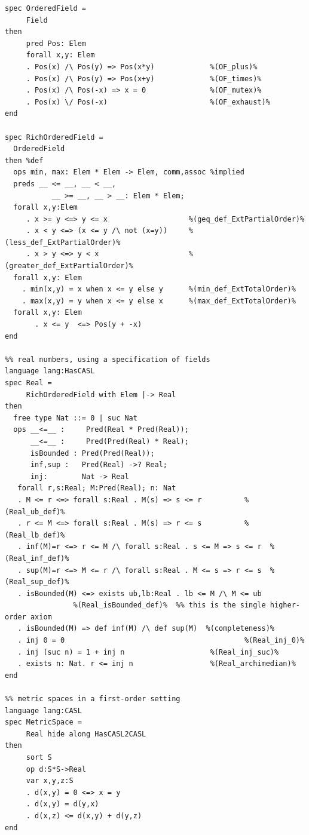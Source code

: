 \documentclass[10pt, a4paper]{isov2}
\begin{document}
\begin{lstlisting}[basicstyle=\ttfamily,language=dolText,alsolanguage=CASL,escapechar=@,mathescape]
spec OrderedField =
     Field
then
     pred Pos: Elem
     forall x,y: Elem
     . Pos(x) /\ Pos(y) => Pos(x*y)             %(OF_plus)%
     . Pos(x) /\ Pos(y) => Pos(x+y)             %(OF_times)%
     . Pos(x) /\ Pos(-x) => x = 0               %(OF_mutex)%
     . Pos(x) \/ Pos(-x)                        %(OF_exhaust)%
end

spec RichOrderedField =
  OrderedField 
then %def
  ops min, max: Elem * Elem -> Elem, comm,assoc %implied
  preds __ <= __, __ < __,
           __ >= __, __ > __: Elem * Elem;
  forall x,y:Elem
     . x >= y <=> y <= x                   %(geq_def_ExtPartialOrder)%
     . x < y <=> (x <= y /\ not (x=y))     %(less_def_ExtPartialOrder)%
     . x > y <=> y < x                     %(greater_def_ExtPartialOrder)%
  forall x,y: Elem
    . min(x,y) = x when x <= y else y      %(min_def_ExtTotalOrder)%
    . max(x,y) = y when x <= y else x      %(max_def_ExtTotalOrder)%
  forall x,y: Elem
       . x <= y  <=> Pos(y + -x)
end

%% real numbers, using a specification of fields
language lang:HasCASL
spec Real =
     RichOrderedField with Elem |-> Real
then
  free type Nat ::= 0 | suc Nat
  ops __<=__ :     Pred(Real * Pred(Real));
      __<=__ :     Pred(Pred(Real) * Real);
      isBounded : Pred(Pred(Real));
      inf,sup :   Pred(Real) ->? Real;
      inj:        Nat -> Real
   forall r,s:Real; M:Pred(Real); n: Nat
   . M <= r <=> forall s:Real . M(s) => s <= r          %(Real_ub_def)%
   . r <= M <=> forall s:Real . M(s) => r <= s          %(Real_lb_def)%
   . inf(M)=r <=> r <= M /\ forall s:Real . s <= M => s <= r  %(Real_inf_def)%
   . sup(M)=r <=> M <= r /\ forall s:Real . M <= s => r <= s  %(Real_sup_def)%
   . isBounded(M) <=> exists ub,lb:Real . lb <= M /\ M <= ub
                %(Real_isBounded_def)%  %% this is the single higher-order axiom
   . isBounded(M) => def inf(M) /\ def sup(M)  %(completeness)%
   . inj 0 = 0                                          %(Real_inj_0)%
   . inj (suc n) = 1 + inj n                    %(Real_inj_suc)%
   . exists n: Nat. r <= inj n                  %(Real_archimedian)%
end

%% metric spaces in a first-order setting
language lang:CASL
spec MetricSpace =
     Real hide along HasCASL2CASL
then
     sort S
     op d:S*S->Real
     var x,y,z:S
     . d(x,y) = 0 <=> x = y
     . d(x,y) = d(y,x)
     . d(x,z) <= d(x,y) + d(y,z)
end

\end{lstlisting}


\end{document}
